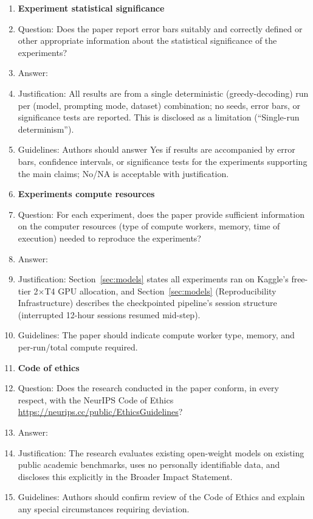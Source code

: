 \documentclass{article}
\begin{document}
\begin{enumerate}
\item {\bf Experiment statistical significance}
    \item[] Question: Does the paper report error bars suitably and correctly defined or other appropriate information about the statistical significance of the experiments?
    \item[] Answer: \answerNo{}
    \item[] Justification: All results are from a single deterministic (greedy-decoding) run per (model, prompting mode, dataset) combination; no seeds, error bars, or significance tests are reported. This is disclosed as a limitation (``Single-run determinism'').
    \item[] Guidelines: Authors should answer Yes if results are accompanied by error bars, confidence intervals, or significance tests for the experiments supporting the main claims; No/NA is acceptable with justification.

\item {\bf Experiments compute resources}
    \item[] Question: For each experiment, does the paper provide sufficient information on the computer resources (type of compute workers, memory, time of execution) needed to reproduce the experiments?
    \item[] Answer: \answerYes{}
    \item[] Justification: Section~\ref{sec:models} states all experiments ran on Kaggle's free-tier 2$\times$T4 GPU allocation, and Section~\ref{sec:models} (Reproducibility Infrastructure) describes the checkpointed pipeline's session structure (interrupted 12-hour sessions resumed mid-step).
    \item[] Guidelines: The paper should indicate compute worker type, memory, and per-run/total compute required.

\item {\bf Code of ethics}
    \item[] Question: Does the research conducted in the paper conform, in every respect, with the NeurIPS Code of Ethics \url{https://neurips.cc/public/EthicsGuidelines}?
    \item[] Answer: \answerYes{}
    \item[] Justification: The research evaluates existing open-weight models on existing public academic benchmarks, uses no personally identifiable data, and discloses this explicitly in the Broader Impact Statement.
    \item[] Guidelines: Authors should confirm review of the Code of Ethics and explain any special circumstances requiring deviation.


\end{enumerate}
\end{document}
